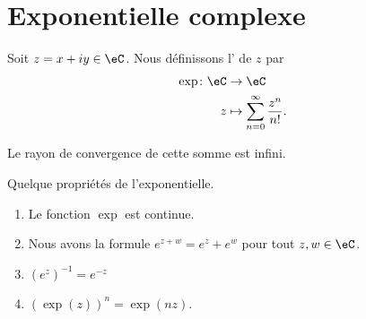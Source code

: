 \section{Exponentielle complexe}

\begin{definition}  \label{DefJilXoM}
    Soit \( z=x+iy\in \eC\). Nous définissons l' de \( z\) par
    \begin{equation}
        \begin{aligned}
            \exp\colon \eC&\to \eC \\
            z&\mapsto \sum_{n=0}^{\infty}\frac{ z^n }{ n! }. 
        \end{aligned}
    \end{equation}
\end{definition}
Le rayon de convergence de cette somme est infini.

\begin{proposition}     \label{PropdDjisy}
    Quelque propriétés de l'exponentielle.
    \begin{enumerate}
        \item
            Le fonction \( \exp\) est continue.
        \item
            Nous avons la formule \(  e^{z+w}= e^{z}+e^w\) pour tout \( z,w\in \eC\).
        \item
            \( (e^z)^{-1}= e^{-z}\)
        \item
            \( (\exp(z))^n=\exp(nz)\).
    \end{enumerate}
\end{proposition}

